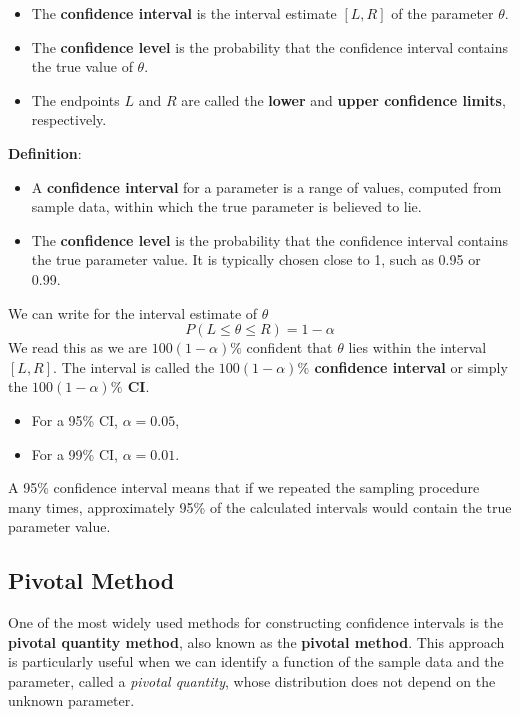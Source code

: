 \documentclass[twoside]{book}
\begin{document}
\begin{itemize}
    \item The \textbf{confidence interval} is the interval estimate $[L, R]$ of the parameter $\theta$.
    \item The \textbf{confidence level} is the probability that the confidence interval contains the true value of $\theta$.
    \item The endpoints $L$ and $R$ are called the \textbf{lower} and \textbf{upper confidence limits}, respectively.
\end{itemize}

\begin{textbox}
\textbf{Definition}:
\begin{itemize}
    \item A \textbf{confidence interval} for a parameter is a range of values, computed from sample data, within which the true parameter is believed to lie.
    \item The \textbf{confidence level} is the probability that the confidence interval contains the true parameter value. It is typically chosen close to 1, such as 0.95 or 0.99.
\end{itemize}
\end{textbox}
\bigskip

We can write for the interval estimate of $\theta$
\[
P(L \leq \theta \leq R) = 1 - \alpha
\]
We read this as we are $100(1 - \alpha)\%$ confident that $\theta$ lies within the interval $[L, R]$. The interval is called the \textbf{$100(1 - \alpha)\%$ confidence interval} or simply the \textbf{$100(1 - \alpha)\%$ CI}.

\begin{itemize}
    \item For a 95\% CI, $\alpha = 0.05$,
    \item For a 99\% CI, $\alpha = 0.01$.
\end{itemize}

A 95\% confidence interval means that if we repeated the sampling procedure many times, approximately 95\% of the calculated intervals would contain the true parameter value.


\subsection{Pivotal Method}

One of the most widely used methods for constructing confidence intervals is the \textbf{pivotal quantity method}, also known as the \textbf{pivotal method}. This approach is particularly useful when we can identify a function of the sample data and the parameter, called a \emph{pivotal quantity}, whose distribution does not depend on the unknown parameter.
\end{document}
